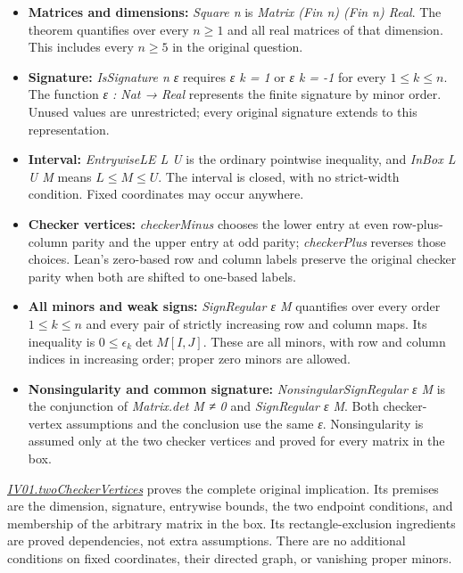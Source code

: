 \documentclass[11pt,a4paper]{article}
\providecommand{\tightlist}{\setlength{\itemsep}{0pt}\setlength{\parskip}{0pt}}
\begin{document}
\begin{itemize}
\tightlist
\item
  \textbf{Matrices and dimensions:} \textit{Square n} is
  \textit{Matrix (Fin n) (Fin n) Real}. The theorem quantifies over
  every \(n\ge1\) and all real matrices of that dimension. This includes
  every \(n\ge5\) in the original question.
\item
  \textbf{Signature:} \textit{IsSignature n ε} requires
  \textit{ε k = 1} or \textit{ε k = -1} for every \(1\le k\le n\).
  The function \textit{ε : Nat → Real} represents the finite
  signature by minor order. Unused values are unrestricted; every
  original signature extends to this representation.
\item
  \textbf{Interval:} \textit{EntrywiseLE L U} is the ordinary
  pointwise inequality, and \textit{InBox L U M} means
  \(L\le M\le U\). The interval is closed, with no strict-width
  condition. Fixed coordinates may occur anywhere.
\item
  \textbf{Checker vertices:} \textit{checkerMinus} chooses the lower
  entry at even row-plus-column parity and the upper entry at odd
  parity; \textit{checkerPlus} reverses those choices. Lean's zero-based
  row and column labels preserve the original checker parity when both
  are shifted to one-based labels.
\item
  \textbf{All minors and weak signs:} \textit{SignRegular ε M}
  quantifies over every order \(1\le k\le n\) and every pair of strictly
  increasing row and column maps. Its inequality is
  \(0\le\epsilon_k\det M[I,J]\). These are all minors, with row and
  column indices in increasing order; proper zero minors are allowed.
\item
  \textbf{Nonsingularity and common signature:}
  \textit{NonsingularSignRegular ε M} is the conjunction of
  \textit{Matrix.det M ≠ 0} and \textit{SignRegular ε M}. Both
  checker-vertex assumptions and the conclusion use the same \textit{ε}.
  Nonsingularity is assumed only at the two checker vertices and proved
  for every matrix in the box.
\end{itemize}

\href{https://github.com/erenup/two-vertex-sign-regularity/blob/22fedcfb6940fd943d67f1582068ed5b9b91a83e/lean/IV01/Statement.lean}{\textit{IV01.twoCheckerVertices}}
proves the complete original implication. Its premises are the
dimension, signature, entrywise bounds, the two endpoint conditions, and
membership of the arbitrary matrix in the box. Its rectangle-exclusion
ingredients are proved dependencies, not extra assumptions. There are no
additional conditions on fixed coordinates, their directed graph, or
vanishing proper minors.
\end{document}
